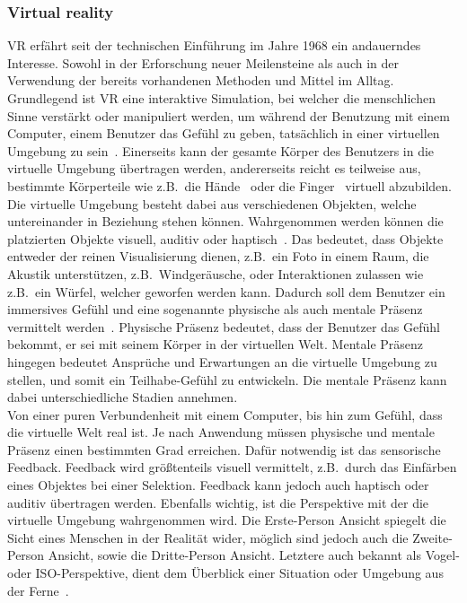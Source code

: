 \subsubsection{Virtual reality}
VR erfährt seit der technischen Einführung im Jahre 1968 ein andauerndes Interesse. Sowohl in der Erforschung neuer Meilensteine als auch in der Verwendung der bereits vorhandenen Methoden und Mittel im Alltag. Grundlegend ist VR eine interaktive Simulation, bei welcher die menschlichen Sinne verstärkt oder manipuliert werden, um während der Benutzung mit einem Computer, einem Benutzer das Gefühl zu geben, tatsächlich in einer virtuellen Umgebung zu sein~\cite{virtualreality}. Einerseits kann der gesamte Körper des Benutzers in die virtuelle Umgebung übertragen werden, andererseits reicht es teilweise aus, bestimmte Körperteile wie z.B.~die Hände~\cite{handtracking} oder die Finger~\cite{fingertracking} virtuell abzubilden. Die virtuelle Umgebung besteht dabei aus verschiedenen Objekten, welche untereinander in Beziehung stehen können. Wahrgenommen werden können die platzierten Objekte visuell, auditiv oder haptisch~\cite{virtualreality}. Das bedeutet, dass Objekte entweder der reinen Visualisierung dienen, z.B.~ein Foto in einem Raum, die Akustik unterstützen, z.B.~Windgeräusche, oder Interaktionen zulassen wie z.B.~ein Würfel, welcher geworfen werden kann. Dadurch soll dem Benutzer ein immersives Gefühl und eine sogenannte physische als auch mentale Präsenz vermittelt werden~\cite{hmds}. Physische Präsenz bedeutet, dass der Benutzer das Gefühl bekommt, er sei mit seinem Körper in der virtuellen Welt. Mentale Präsenz hingegen bedeutet Ansprüche und Erwartungen an die virtuelle Umgebung zu stellen, und somit ein Teilhabe-Gefühl zu entwickeln. Die mentale Präsenz kann dabei unterschiedliche Stadien annehmen.\\
Von einer puren Verbundenheit mit einem Computer, bis hin zum Gefühl, dass die virtuelle Welt real ist. Je nach Anwendung müssen physische und mentale Präsenz einen bestimmten Grad erreichen. Dafür notwendig ist das sensorische Feedback. Feedback wird größtenteils visuell vermittelt, z.B.~durch das Einfärben eines Objektes bei einer Selektion. Feedback kann jedoch auch haptisch oder auditiv übertragen werden. Ebenfalls wichtig, ist die Perspektive mit der die virtuelle Umgebung wahrgenommen wird. Die Erste-Person Ansicht spiegelt die Sicht eines Menschen in der Realität wider, möglich sind jedoch auch die Zweite-Person Ansicht, sowie die Dritte-Person Ansicht. Letztere auch bekannt als Vogel- oder ISO-Perspektive, dient dem Überblick einer Situation oder Umgebung aus der Ferne~\cite{virtualreality}.\\

